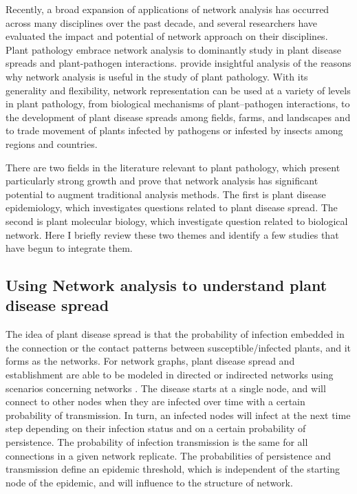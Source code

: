 Recently, a broad expansion of applications of network analysis has occurred across many disciplines over the past decade, and several researchers have evaluated the impact and potential of network approach on their disciplines. Plant pathology embrace network analysis to dominantly study in plant disease spreads and plant-pathogen interactions.  provide insightful analysis of the reasons why network analysis is useful in the study of plant pathology. With its generality and flexibility, network representation can be used at a variety of levels in plant pathology, from biological mechanisms of plant–pathogen interactions, to the development of plant disease spreads among fields, farms, and landscapes and to trade movement of plants infected by pathogens or infested by insects among regions and countries. 

There are two fields in the literature relevant to plant pathology, which present particularly strong growth and prove that network analysis has significant potential to augment traditional analysis methods. The first is plant disease epidemiology, which investigates questions related to plant disease spread. The second is plant molecular biology, which investigate question related to biological network. Here I briefly review these two themes and identify a few studies that have begun to integrate them.


\subsection*{Using Network analysis to understand plant disease spread}

The idea of plant disease spread is that the probability of infection embedded in the connection or the contact patterns between susceptible/infected plants, and it forms as the networks. For network graphs, plant disease spread and establishment are able to be modeled in directed or indirected networks using scenarios concerning networks . The disease starts at a single node, and will connect to other nodes when they are infected over time with a certain probability of transmission. In turn, an infected nodes will infect at the next time step depending on their infection status and on a certain probability of persistence. The probability of infection transmission is the same for all connections in a given network replicate. The probabilities of persistence and transmission define an epidemic threshold, which is independent of the starting node of the epidemic, and will influence to the structure of network. 

